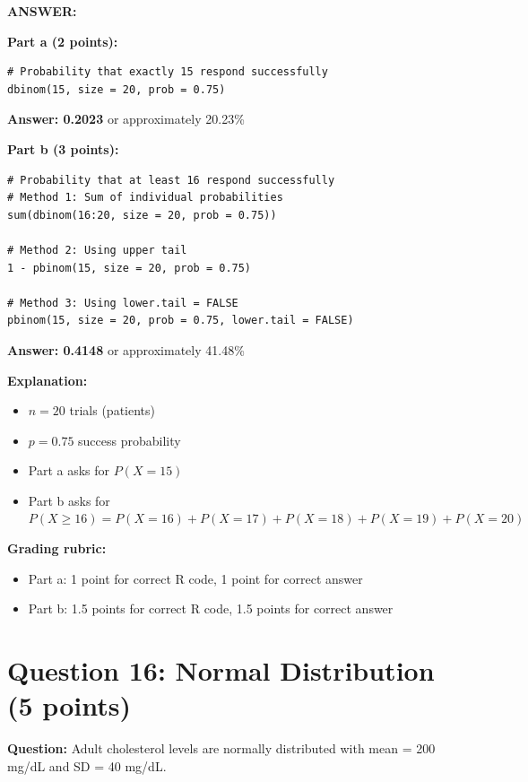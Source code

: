 \documentclass[11pt]{article}
\begin{document}
\textbf{ANSWER:}

\textbf{Part a (2 points):}

\begin{lstlisting}[style=Rstyle]
# Probability that exactly 15 respond successfully
dbinom(15, size = 20, prob = 0.75)
\end{lstlisting}

\textbf{Answer: 0.2023} or approximately 20.23\%

\textbf{Part b (3 points):}

\begin{lstlisting}[style=Rstyle]
# Probability that at least 16 respond successfully
# Method 1: Sum of individual probabilities
sum(dbinom(16:20, size = 20, prob = 0.75))

# Method 2: Using upper tail
1 - pbinom(15, size = 20, prob = 0.75)

# Method 3: Using lower.tail = FALSE
pbinom(15, size = 20, prob = 0.75, lower.tail = FALSE)
\end{lstlisting}

\textbf{Answer: 0.4148} or approximately 41.48\%

\textbf{Explanation:}
\begin{itemize}
    \item $n = 20$ trials (patients)
    \item $p = 0.75$ success probability
    \item Part a asks for $P(X = 15)$
    \item Part b asks for $P(X \geq 16) = P(X = 16) + P(X = 17) + P(X = 18) + P(X = 19) + P(X = 20)$
\end{itemize}

\textbf{Grading rubric:}
\begin{itemize}
    \item Part a: 1 point for correct R code, 1 point for correct answer
    \item Part b: 1.5 points for correct R code, 1.5 points for correct answer
\end{itemize}

\vspace{0.3cm}
\noindent\hrulefill

\section*{Question 16: Normal Distribution (5 points)}

\textbf{Question:} Adult cholesterol levels are normally distributed with mean = 200 mg/dL and SD = 40 mg/dL.
\end{document}
